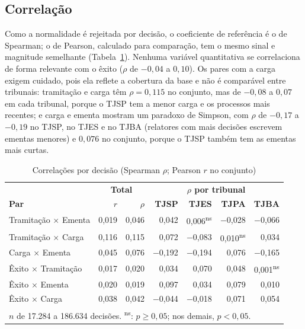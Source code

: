 \documentclass[conference]{IEEEtran}
\begin{document}
\subsection{Correlação}

Como a normalidade é rejeitada por decisão, o coeficiente de referência é o de
Spearman; o de Pearson, calculado para comparação, tem o mesmo sinal e
magnitude semelhante (Tabela~\ref{tab:corrdecisao}). Nenhuma variável
quantitativa se correlaciona de forma relevante com o êxito ($\rho$ de
$-0{,}04$ a $0{,}10$). Os pares com a carga exigem cuidado, pois ela reflete a
cobertura da base e não é comparável entre tribunais: tramitação e carga têm
$\rho = 0{,}115$ no conjunto, mas de $-0{,}08$ a $0{,}07$ em cada tribunal,
porque o TJSP tem a menor carga e os processos mais recentes; e carga e ementa
mostram um paradoxo de Simpson, com $\rho$ de $-0{,}17$ a $-0{,}19$ no TJSP, no
TJES e no TJBA (relatores com mais decisões escrevem ementas menores) e
$0{,}076$ no conjunto, porque o TJSP também tem as ementas mais curtas.

\begin{table}[!t]
\caption{Correlações por decisão (Spearman $\rho$; Pearson $r$ no conjunto)}
\label{tab:corrdecisao}
\centering
\scriptsize
\setlength{\tabcolsep}{2.5pt}
\begin{tabular}{lrrrrrr}
\hline
 & \multicolumn{2}{c}{\textbf{Total}} & \multicolumn{4}{c}{\textbf{$\rho$ por tribunal}} \\
\textbf{Par} & \textbf{$r$} & \textbf{$\rho$} & \textbf{TJSP} & \textbf{TJES} & \textbf{TJPA} & \textbf{TJBA} \\
\hline
Tramitação $\times$ Ementa & 0,019 & 0,046 & 0,042 & 0,006\textsuperscript{ns} & $-$0,028 & $-$0,066 \\
Tramitação $\times$ Carga  & 0,116 & 0,115 & 0,072 & $-$0,083 & 0,010\textsuperscript{ns} & 0,034 \\
Carga $\times$ Ementa      & 0,045 & 0,076 & $-$0,192 & $-$0,194 & 0,076 & $-$0,165 \\
Êxito $\times$ Tramitação  & 0,017 & 0,020 & 0,034 & 0,070 & 0,048 & 0,001\textsuperscript{ns} \\
Êxito $\times$ Ementa      & 0,020 & 0,019 & 0,097 & 0,034 & 0,079 & 0,010 \\
Êxito $\times$ Carga       & 0,038 & 0,042 & $-$0,044 & $-$0,018 & 0,071 & 0,054 \\
\hline
\multicolumn{7}{l}{\scriptsize $n$ de 17.284 a 186.634 decisões. \textsuperscript{ns}: $p \geq 0{,}05$; nos demais, $p < 0{,}05$.}
\end{tabular}
\end{table}
\end{document}
